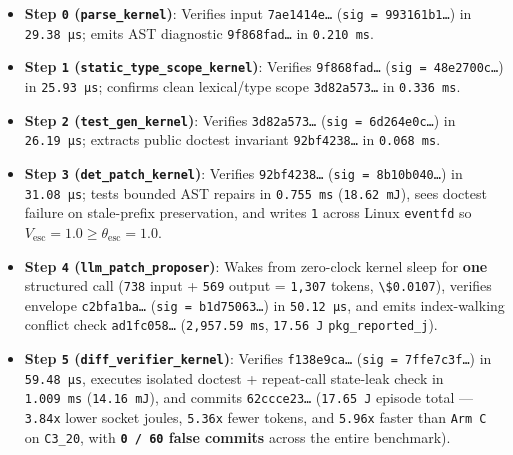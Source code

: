 \documentclass[10pt,letterpaper]{article}
\providecommand{\tightlist}{\setlength{\itemsep}{1pt}\setlength{\parskip}{0pt}}
\begin{document}
\begin{enumerate}
  \begin{itemize}
  \tightlist
  \item
    \textbf{Step \texttt{0} (\texttt{parse\_\allowbreak{}kernel})}: Verifies input
    \texttt{7ae1414e…} (\texttt{sig\ =\ 993161b1…}) in
    \texttt{29.38\ µs}; emits AST diagnostic \texttt{9f868fad…} in
    \texttt{0.210\ ms}.
  \item
    \textbf{Step \texttt{1} (\texttt{static\_\allowbreak{}type\_\allowbreak{}scope\_\allowbreak{}kernel})}:
    Verifies \texttt{9f868fad…} (\texttt{sig\ =\ 48e2700c…}) in
    \texttt{25.93\ µs}; confirms clean lexical/type scope
    \texttt{3d82a573…} in \texttt{0.336\ ms}.
  \item
    \textbf{Step \texttt{2} (\texttt{test\_\allowbreak{}gen\_\allowbreak{}kernel})}: Verifies
    \texttt{3d82a573…} (\texttt{sig\ =\ 6d264e0c…}) in
    \texttt{26.19\ µs}; extracts public doctest invariant
    \texttt{92bf4238…} in \texttt{0.068\ ms}.
  \item
    \textbf{Step \texttt{3} (\texttt{det\_\allowbreak{}patch\_\allowbreak{}kernel})}: Verifies
    \texttt{92bf4238…} (\texttt{sig\ =\ 8b10b040…}) in
    \texttt{31.08\ µs}; tests bounded AST repairs in \texttt{0.755\ ms}
    (\texttt{18.62\ mJ}), sees doctest failure on stale-prefix
    preservation, and writes \texttt{1} across Linux \texttt{eventfd} so
    \(V_{\text{esc}} = 1.0 \ge \theta_{\text{esc}} = 1.0\).
  \item
    \textbf{Step \texttt{4} (\texttt{llm\_\allowbreak{}patch\_\allowbreak{}proposer})}: Wakes from
    zero-clock kernel sleep for \textbf{one} structured call
    (\texttt{738} input + \texttt{569} output = \texttt{1,307} tokens,
    \texttt{\textbackslash{}\$0.0107}), verifies envelope
    \texttt{c2bfa1ba…} (\texttt{sig\ =\ b1d75063…}) in
    \texttt{50.12\ µs}, and emits index-walking conflict check
    \texttt{ad1fc058…} (\texttt{2,\allowbreak{}957.\allowbreak{}59\ ms}, \texttt{17.56\ J}
    \texttt{pkg\_\allowbreak{}reported\_\allowbreak{}j}).
  \item
    \textbf{Step \texttt{5} (\texttt{diff\_\allowbreak{}verifier\_\allowbreak{}kernel})}: Verifies
    \texttt{f138e9ca…} (\texttt{sig\ =\ 7ffe7c3f…}) in
    \texttt{59.48\ µs}, executes isolated doctest + repeat-call
    state-leak check in \texttt{1.009\ ms} (\texttt{14.16\ mJ}), and
    commits \texttt{62ccce23…} (\texttt{17.65\ J} episode total ---
    \texttt{3.84x} lower socket joules, \texttt{5.36x} fewer tokens, and
    \texttt{5.96x} faster than \texttt{Arm\ C} on \texttt{C3\_20}, with
    \textbf{\texttt{0\ /\ 60} false commits} across the entire
    benchmark).
  \end{itemize}
\end{enumerate}
\end{document}

